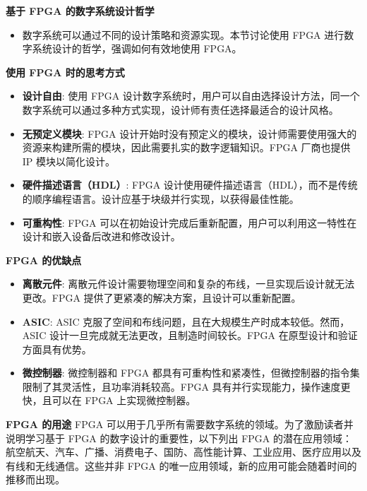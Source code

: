 \documentclass[
  ignorenonframetext,
  chinese,
]{beamer}
\providecommand{\tightlist}{%
  \setlength{\itemsep}{0pt}\setlength{\parskip}{0pt}}
\begin{document}
\begin{frame}
\begin{block}{\textbf{基于 FPGA 的数字系统设计哲学}}
\label{ux57faux4e8e-fpga-ux7684ux6570ux5b57ux7cfbux7edfux8bbeux8ba1ux54f2ux5b66}
\begin{itemize}
\tightlist
\item
  数字系统可以通过不同的设计策略和资源实现。本节讨论使用 FPGA
  进行数字系统设计的哲学，强调如何有效地使用 FPGA。
\end{itemize}
\end{block}

\begin{block}{\textbf{使用 FPGA 时的思考方式}}
\label{ux4f7fux7528-fpga-ux65f6ux7684ux601dux8003ux65b9ux5f0f}
\begin{itemize}
\tightlist
\item
  \textbf{设计自由}: 使用 FPGA
  设计数字系统时，用户可以自由选择设计方法，同一个数字系统可以通过多种方式实现，设计师有责任选择最适合的设计风格。
\item
  \textbf{无预定义模块}: FPGA
  设计开始时没有预定义的模块，设计师需要使用强大的资源来构建所需的模块，因此需要扎实的数字逻辑知识。FPGA
  厂商也提供 IP 模块以简化设计。
\item
  \textbf{硬件描述语言（HDL）}: FPGA
  设计使用硬件描述语言（HDL），而不是传统的顺序编程语言。设计应基于块级并行实现，以获得最佳性能。
\item
  \textbf{可重构性}: FPGA
  可以在初始设计完成后重新配置，用户可以利用这一特性在设计和嵌入设备后改进和修改设计。
\end{itemize}
\end{block}

\begin{block}{\textbf{FPGA 的优缺点}}
\label{fpga-ux7684ux4f18ux7f3aux70b9}
\begin{itemize}
\tightlist
\item
  \textbf{离散元件}:
  离散元件设计需要物理空间和复杂的布线，一旦实现后设计就无法更改。FPGA
  提供了更紧凑的解决方案，且设计可以重新配置。
\item
  \textbf{ASIC}: ASIC
  克服了空间和布线问题，且在大规模生产时成本较低。然而，ASIC
  设计一旦完成就无法更改，且制造时间较长。FPGA
  在原型设计和验证方面具有优势。
\item
  \textbf{微控制器}: 微控制器和 FPGA
  都具有可重构性和紧凑性，但微控制器的指令集限制了其灵活性，且功率消耗较高。FPGA
  具有并行实现能力，操作速度更快，且可以在 FPGA 上实现微控制器。
\end{itemize}
\end{block}

\begin{block}{\textbf{FPGA 的用途}}
\label{fpga-ux7684ux7528ux9014}
FPGA 可以用于几乎所有需要数字系统的领域。为了激励读者并说明学习基于 FPGA
的数字设计的重要性，以下列出 FPGA
的潜在应用领域：航空航天、汽车、广播、消费电子、国防、高性能计算、工业应用、医疗应用以及有线和无线通信。这些并非
FPGA 的唯一应用领域，新的应用可能会随着时间的推移而出现。
\end{block}
\end{frame}
\end{document}
